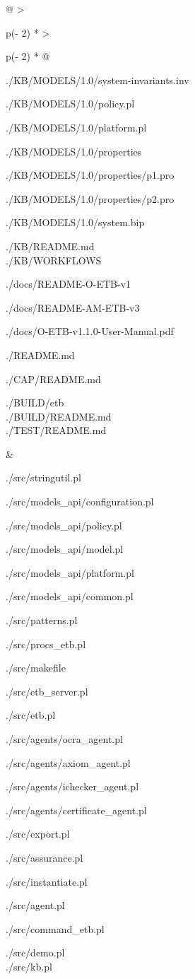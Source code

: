 \documentclass[12pt,twoside,a4paper]{article}
\begin{document}
\begin{longtable}[]{@{}
  >{\raggedright\arraybackslash}p{(\columnwidth - 2\tabcolsep) * }
  >{\raggedright\arraybackslash}p{(\columnwidth - 2\tabcolsep) * }@{}}
\begin{minipage}[b]{\linewidth}
./KB/MODELS/1.0/system-invariants.inv

./KB/MODELS/1.0/policy.pl

./KB/MODELS/1.0/platform.pl

./KB/MODELS/1.0/properties

./KB/MODELS/1.0/properties/p1.pro

./KB/MODELS/1.0/properties/p2.pro

./KB/MODELS/1.0/system.bip

./KB/README.md\\
./KB/WORKFLOWS

./docs/README-O-ETB-v1

./docs/README-AM-ETB-v3

./docs/O-ETB-v1.1.0-User-Manual.pdf

./README.md

./CAP/README.md

./BUILD/etb\\
./BUILD/README.md\\
./TEST/README.md\strut
\end{minipage} & \begin{minipage}[b]{\linewidth}\raggedright
./src/stringutil.pl

./src/models\_api/configuration.pl

./src/models\_api/policy.pl

./src/models\_api/model.pl

./src/models\_api/platform.pl

./src/models\_api/common.pl

./src/patterns.pl

./src/procs\_etb.pl

./src/makefile

./src/etb\_server.pl

./src/etb.pl

./src/agents/ocra\_agent.pl

./src/agents/axiom\_agent.pl

./src/agents/ichecker\_agent.pl

./src/agents/certificate\_agent.pl

./src/export.pl

./src/assurance.pl

./src/instantiate.pl

./src/agent.pl

./src/command\_etb.pl

./src/demo.pl\\
./src/kb.pl


\end{minipage}
\end{longtable}
\end{document}
